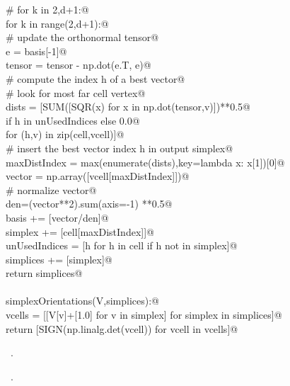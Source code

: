\documentclass[11pt,oneside]{article}	%
\begin{document}
\begin{flushleft}
\begin{minipage}{\linewidth}
\begin{list}{}{}
\mbox{}\verb@      # for k in {2,d+1}:@\\
\mbox{}\verb@      for k in range(2,d+1):@\\
\mbox{}\verb@         # update the orthonormal tensor@\\
\mbox{}\verb@         e = basis[-1]@\\
\mbox{}\verb@         tensor = tensor - np.dot(e.T, e)@\\
\mbox{}\verb@         # compute the index h of a best vector@\\
\mbox{}\verb@         # look for most far cell vertex@\\
\mbox{}\verb@         dists = [SUM([SQR(x) for x in np.dot(tensor,v)])**0.5@\\
\mbox{}\verb@         if h in unUsedIndices else 0.0@\\
\mbox{}\verb@         for (h,v) in zip(cell,vcell)]@\\
\mbox{}\verb@         # insert the best vector index h in output simplex@\\
\mbox{}\verb@         maxDistIndex = max(enumerate(dists),key=lambda x: x[1])[0]@\\
\mbox{}\verb@         vector = np.array([vcell[maxDistIndex]])@\\
\mbox{}\verb@         # normalize vector@\\
\mbox{}\verb@         den=(vector**2).sum(axis=-1) **0.5@\\
\mbox{}\verb@         basis += [vector/den]@\\
\mbox{}\verb@         simplex += [cell[maxDistIndex]]@\\
\mbox{}\verb@         unUsedIndices = [h for h in cell if h not in simplex]@\\
\mbox{}\verb@      simplices += [simplex]@\\
\mbox{}\verb@   return simplices@\\
\mbox{}\verb@@\\
\mbox{}\verb@def simplexOrientations(V,simplices):@\\
\mbox{}\verb@   vcells = [[V[v]+[1.0] for v in simplex] for simplex in simplices]@\\
\mbox{}\verb@   return [SIGN(np.linalg.det(vcell)) for vcell in vcells]@\\
\mbox{}\verb@@{\NWsep}
\end{list}
\vspace{-1ex}
\footnotesize\addtolength{\baselineskip}{-1ex}
\begin{list}{}{\setlength{\itemsep}{-\parsep}\setlength{\itemindent}{-\leftmargin}}
\item \NWtxtMacroDefBy\ .
\item \NWtxtMacroRefIn\ .
\end{list}
\end{minipage}\\[4ex]
\end{flushleft}
\end{document}
